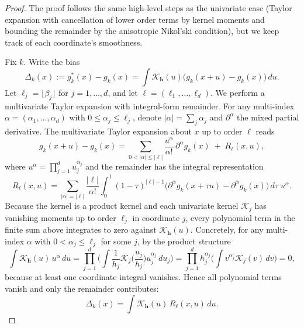 \documentclass[10pt,a4paper]{amsart}
\newcommand{\mcal}{\mathcal}
\begin{document}
\begin{proof}
The proof follows the same high-level steps as the univariate case (Taylor expansion with cancellation of lower order terms by kernel moments and bounding the remainder by the anisotropic Nikol'ski condition), but we keep track of each coordinate's smoothness.

Fix $k$. Write the bias
\[
\Delta_k(x):=g_k^*(x)-g_k(x)=\int \mcal{K}_{\mathbf{h}}(u)\big(g_k(x+u)-g_k(x)\big)\,du.
\]
Let $\ell_j=\lfloor\beta_j\rfloor$ for $j=1,\dots,d$, and let $\ell=(\ell_1,\dots,\ell_d)$. We perform a multivariate Taylor expansion with integral-form remainder. For any multi-index $\alpha=(\alpha_1,\dots,\alpha_d)$ with $0\le\alpha_j\le\ell_j$, denote $|\alpha|=\sum_j\alpha_j$ and $\partial^\alpha$ the mixed partial derivative. The multivariate Taylor expansion about $x$ up to order $\ell$ reads
\[
g_k(x+u)-g_k(x)
= \sum_{0<|\alpha|\le|\ell|}
\frac{u^\alpha}{\alpha!}\,\partial^\alpha g_k(x)
\;+\;
R_\ell(x,u),
\]
where $u^\alpha=\prod_{j=1}^d u_j^{\alpha_j}$ and the remainder has the integral representation
\[
R_\ell(x,u)
= \sum_{|\alpha|=|\ell|}
\frac{|\ell|}{\alpha!}\int_0^1 (1-\tau)^{|\ell|-1}
\Big(\partial^\alpha g_k(x+\tau u)-\partial^\alpha g_k(x)\Big)\,d\tau\; u^\alpha .
\]
Because the kernel is a product kernel and each univariate kernel $\mcal{K}_j$ has vanishing moments up to order $\ell_j$ in coordinate \(j\), every polynomial term in the finite sum above integrates to zero against $\mcal{K}_{\mathbf{h}}(u)$. Concretely, for any multi-index $\alpha$ with $0<\alpha_j\le\ell_j$ for some $j$, by the product structure
\[
\int \mcal{K}_{\mathbf{h}}(u)\, u^\alpha\,du
=\prod_{j=1}^d \Big(\int \frac{1}{h_j} \mcal{K}_j\!\Big(\frac{u_j}{h_j}\Big) u_j^{\alpha_j}\,du_j\Big)
= \prod_{j=1}^d h_j^{\alpha_j}\Big(\int v^{\alpha_j}\mcal{K}_j(v)\,dv\Big)=0,
\]
because at least one coordinate integral vanishes. Hence all polynomial terms vanish and only the remainder contributes:
\[
\Delta_k(x)=\int \mcal{K}_{\mathbf{h}}(u)\, R_\ell(x,u)\,du.
\]


\end{proof}
\end{document}
